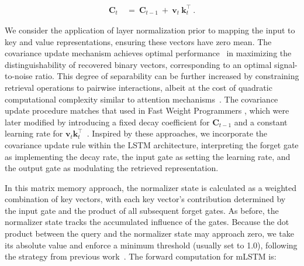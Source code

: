 \begin{align}
\mathbf{C}_t \ &= \ \mathbf{C}_{t-1} \ + \ \mathbf{v}_{t} \ \mathbf{k}_t^\top \ .
\end{align}

We consider the application of layer normalization prior to mapping the input to key and value representations, ensuring these vectors have zero mean. The covariance update mechanism achieves optimal performance~\citep{Dayan:91} in maximizing the distinguishability of recovered binary vectors, corresponding to an optimal signal-to-noise ratio. This degree of separability can be further increased by constraining retrieval operations to pairwise interactions, albeit at the cost of quadratic computational complexity similar to attention mechanisms~\citep{Krotov:16,Krotov:17,Ramsauer:21}. The covariance update procedure matches that used in Fast Weight Programmers \citep{Schmidhuber:92ncfastweights,Schlag:21}, which were later modified by introducing a fixed decay coefficient for $\mathbf{C}_{t-1}$ and a constant learning rate for 
$\mathbf{v}_{t} \mathbf{k}_t ^\top$~\citep{Ba:16}.
Inspired by these approaches, we incorporate the covariance update rule within the LSTM architecture, interpreting the forget gate as implementing the decay rate, the input gate as setting the learning rate, and the output gate as modulating the retrieved representation.

In this matrix memory approach, the normalizer state is calculated as a weighted combination of key vectors, with each key vector's contribution determined by the input gate and the product of all subsequent forget gates. As before, the normalizer state tracks the accumulated influence of the gates. Because the dot product between the query and the normalizer state may approach zero, we take its absolute value and enforce a minimum threshold (usually set to 1.0), following the strategy from previous work~\citep{Sun:23arxiv}. The forward computation for mLSTM is:

